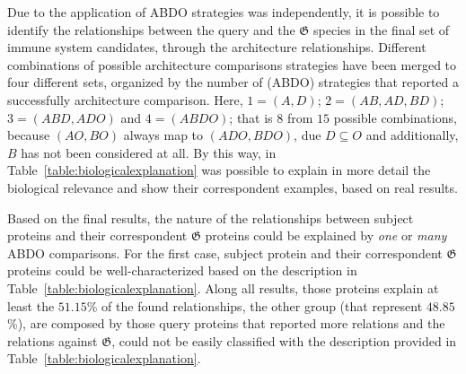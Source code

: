 \documentclass[11pt]{article}
\begin{document}
Due to the application of ABDO strategies was independently, it is possible to 
identify the relationships between the query and the $\boldsymbol{\mathfrak{G}}$
species in the final set of immune system candidates, through the architecture
relationships. Different combinations of possible architecture comparisons
strategies have been merged to four different sets, organized by the number of
(ABDO) strategies that reported a successfully architecture comparison. Here, $1
= (A, D)$; $2 = (AB, AD, BD)$; $3 = (ABD, ADO)$ and $4 = (ABDO)$; that is $8$
from $15$ possible combinations, because $(AO, BO)$ always map to $(ADO,
BDO)$, due $D \subseteq O$ and additionally, $B$ has not been considered at all.
By this way, in Table~\ref{table:biologicalexplanation} was
possible to explain in more detail the biological relevance and show their
correspondent examples, based on real results.

Based on the final results, the nature of the relationships between subject
proteins and their correspondent $\boldsymbol{\mathfrak{G}}$ proteins could be
explained by \textit{one} or \textit{many} ABDO comparisons. For the first case,
subject protein and their correspondent $\boldsymbol{\mathfrak{G}}$ proteins
could be well-characterized based on the description in
Table~\ref{table:biologicalexplanation}. Along all results, those proteins
explain at least the $51.15$\% of the found relationships, the other group (that
represent $48.85$\%), are composed by those query proteins that reported more
relations and the relations against $\boldsymbol{\mathfrak{G}}$, could not be
easily classified with the description provided in
Table~\ref{table:biologicalexplanation}.
\end{document}
